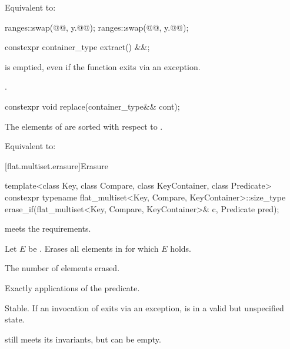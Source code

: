 \begin{itemdescr}
\pnum
\effects
Equivalent to:
\begin{codeblock}
ranges::swap(@@, y.@@);
ranges::swap(@@, y.@@);
\end{codeblock}
\end{itemdescr}

%
\begin{itemdecl}
constexpr container_type extract() &&;
\end{itemdecl}

\begin{itemdescr}
\pnum
\ensures
{} is emptied, even if the function exits via an exception.

\pnum
\returns
{}.
\end{itemdescr}

%
\begin{itemdecl}
constexpr void replace(container_type&& cont);
\end{itemdecl}

\begin{itemdescr}
\pnum
\expects
The elements of  are sorted with respect to .

\pnum
\effects
Equivalent to: 
\end{itemdescr}

[flat.multiset.erasure]{Erasure}

%
\begin{itemdecl}
template<class Key, class Compare, class KeyContainer, class Predicate>
  constexpr typename flat_multiset<Key, Compare, KeyContainer>::size_type
    erase_if(flat_multiset<Key, Compare, KeyContainer>& c, Predicate pred);
\end{itemdecl}

\begin{itemdescr}
\pnum
\expects
{} meets the  requirements.

\pnum
\effects
Let $E$ be .
Erases all elements  in  for which $E$ holds.

\pnum
\returns
The number of elements erased.

\pnum
\complexity
Exactly  applications of the predicate.

\pnum
\remarks
Stable.
If an invocation of  exits via an exception,
 is in a valid but unspecified state.
\begin{note}
 still meets its invariants, but can be empty.
\end{note}
\end{itemdescr}

